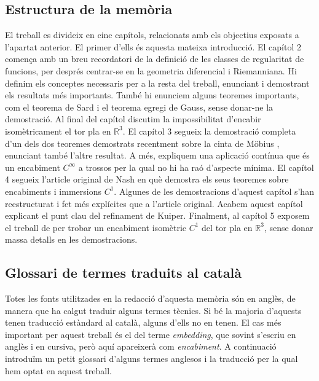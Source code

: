 \subsection*{Estructura de la mem\`oria}
El treball es divideix en cinc capítols, relacionats amb els objectius exposats a l'apartat anterior. El primer d'ells és aquesta mateixa introducció. El capítol 2 comença amb un breu recordatori de la definició de les classes de regularitat de funcions, per després centrar-se en la geometria diferencial i Riemanniana. Hi definim els conceptes necessaris per a la resta del treball, enunciant i demostrant els resultats més importants. També hi enunciem alguns teoremes importants, com el teorema de Sard i el teorema egregi de Gauss, sense donar-ne la demostració. Al final del capítol discutim la impossibilitat d'encabir isomètricament el tor pla en $\mathbb R^3$. El capítol 3 segueix la demostració completa d'un dels dos teoremes demostrats recentment sobre la cinta de Möbius \cite{schwartz2024}, enunciant també l'altre resultat. A més, expliquem una aplicació contínua que és un encabiment $C^\infty$ a trossos per la qual no hi ha raó d'aspecte mínima. El capítol 4 segueix l'article original de Nash en què demostra els seus teoremes sobre encabiments i immersions $C^1$. Algunes de les demostracions d'aquest capítol s'han reestructurat i fet més explícites que a l'article original. Acabem aquest capítol explicant el punt clau del refinament de Kuiper. Finalment, al capítol 5 exposem el treball de \citet{borrelli2013} per trobar un encabiment isomètric $C^1$ del tor pla en $\mathbb R^3$, sense donar massa detalls en les demostracions. 
\subsection*{Glossari de termes traduits al català}
Totes les fonts utilitzades en la redacció d'aquesta memòria són en anglès, de manera que ha calgut traduir alguns termes tècnics. Si bé la majoria d'aquests tenen traducció estàndard al català, alguns d'ells no en tenen. El cas més important per aquest treball és el del terme \textit{embedding}, que sovint s'escriu en anglès i en cursiva, però aquí apareixerà com \textit{encabiment}. A continuació introduïm un petit glossari d'alguns termes anglesos i la traducció per la qual hem optat en aquest treball. 


